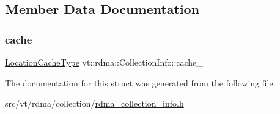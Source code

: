 \subsection{Member Data Documentation}
\mbox{\label{structvt_1_1rdma_1_1_collection_info_ae929d6028b34287f845cbe5a2ca56bd4}} 
\subsubsection{\texorpdfstring{cache\+\_\+}{cache\_}}
{\footnotesize\ttfamily \hyperlink{structvt_1_1rdma_1_1_collection_info_a25a687ebde2ae64ae23dd9a7216071be}{Location\+Cache\+Type} vt\+::rdma\+::\+Collection\+Info\+::cache\+\_\+\hspace{0.3cm}{\ttfamily [private]}}



The documentation for this struct was generated from the following file\+:\begin{DoxyCompactItemize}
\item 
src/vt/rdma/collection/\hyperlink{rdma__collection__info_8h}{rdma\+\_\+collection\+\_\+info.\+h}\end{DoxyCompactItemize}
